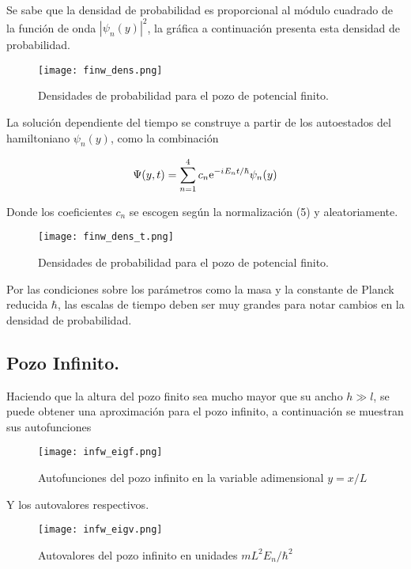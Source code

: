 \documentclass{article}
\newcommand{\iu}{{i\mkern1mu}}
\begin{document}
Se sabe que la densidad de probabilidad es proporcional al módulo cuadrado de la función de onda $|\psi_n(y)|^2$, la gráfica a continuación presenta esta densidad de probabilidad.

\begin{figure}[htp]
    \centering
    \texttt{[image: finw\_dens.png]}
    \caption{Densidades de probabilidad para el pozo de potencial finito.}
    \label{fig:my_label}
\end{figure}

La solución dependiente del tiempo se construye a partir de los autoestados del hamiltoniano $\psi_{n}(y)$, como la combinación 

\begin{equation}
    \Psi(y,t)=\sum_{n=1}^{4}c_n\mathrm{e}^{-\iu E_n t/\hbar}\psi_n(y)
\end{equation}

Donde los coeficientes $c_n$ se escogen según la normalización (5) y aleatoriamente.

\begin{figure}[htp]
    \centering
    \texttt{[image: finw\_dens\_t.png]}
    \caption{Densidades de probabilidad para el pozo de potencial finito.}
    \label{fig:my_label}
\end{figure}

Por las condiciones sobre los parámetros como la masa y la constante de Planck reducida $\hbar$, las escalas de tiempo deben ser muy grandes para notar cambios en la densidad de probabilidad.



\subsection{Pozo Infinito.}

Haciendo que la altura del pozo finito sea mucho mayor que su ancho $h\gg l$, se puede obtener una aproximación para el pozo infinito, a continuación se muestran sus autofunciones

\begin{figure}[htp]
    \centering
    \texttt{[image: infw\_eigf.png]}
    \caption{Autofunciones del pozo infinito en la variable adimensional $y=x/L$}
    \label{fig:my_label}
\end{figure}

\newpage
Y los autovalores respectivos.

\begin{figure}[htp]
    \centering
    \texttt{[image: infw\_eigv.png]}
    \caption{Autovalores del pozo infinito en unidades $mL^2E_n/\hbar^2$}
    \label{fig:my_label}
\end{figure}
\end{document}
